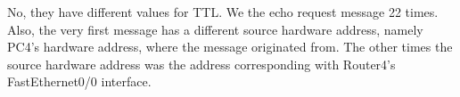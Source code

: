 No, they have different values for TTL. We the echo request message 22 times. Also, the very first message has a different source hardware address, namely PC4's hardware address, where the message originated from. The other times the source hardware address was the address corresponding with Router4's FastEthernet0/0 interface.